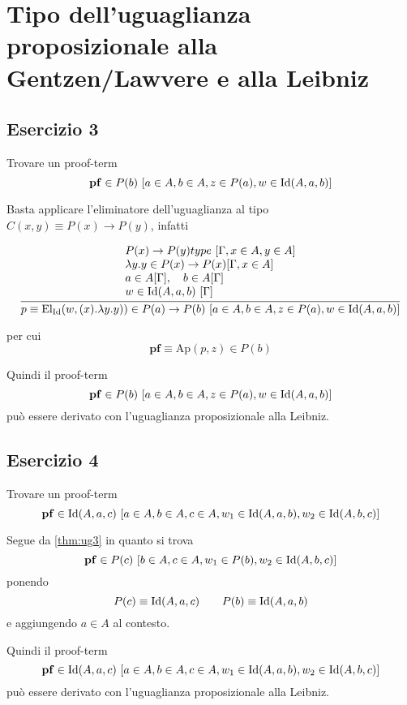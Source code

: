 \newpage
\section{Tipo dell'uguaglianza proposizionale alla Gentzen/Lawvere e alla Leibniz}
\subsection{Esercizio 3}
\begin{thm}\label{thm:ug3} Trovare un proof-term
	\[ \mathbf{pf}\in P(b)\ [a\in A, b\in A, z\in P(a), w\in \mathrm{Id}(A, a, b)]\]
\end{thm}
\proof
Basta applicare l'eliminatore dell'uguaglianza al tipo $C(x,y) \equiv P(x)\to P(y)$, infatti
\begin{scriptsize}
	\[ \infer{p \equiv \mathrm{El}_{\mathrm{Id}}(w, (x).\lambda y. y)) \in P(a)\to P(b)\ [a \in A, b\in A, z\in P(a), w\in \Id{A}{a}{b}]}{\begin{array}{l}P(x)\to P(y) type\ [\Gamma, x \in A, y \in A] \\ \lambda y. y \in P(x) \to P(x)  [\Gamma, x \in A] \\
		a \in A [\Gamma], \quad b \in A [\Gamma] \\
		w \in \Id{A}{a}{b}\ [\Gamma] \end{array}} \]
\end{scriptsize}
per cui 
\[ \mathbf{pf} \equiv \mathrm{Ap}(p, z) \in P(b) \]
\endproof

Quindi il proof-term \[ \mathbf{pf}\in P(b)\ [a\in A, b\in A, z\in P(a), w\in \mathrm{Id}(A, a, b)]\] può essere derivato con l'uguaglianza proposizionale alla Leibniz.

\subsection{Esercizio 4}
\begin{thm}
	Trovare un proof-term
	\[ \mathbf{pf} \in \mathrm{Id}(A, a, c)\ [a\in A, b\in A, c\in A, w_1 \in \mathrm{Id}(A, a, b), w_2 \in \mathrm{Id}(A, b, c) ] \]
\end{thm}

\proof
Segue da \ref{thm:ug3} in quanto si trova
\[ \mathbf{pf} \in P(c)\ [b\in A, c \in A, w_1 \in P(b), w_2 \in \mathrm{Id}(A, b, c)] \]
ponendo
\[ P(c) \equiv \mathrm{Id}(A, a, c) \qquad P(b) \equiv \mathrm{Id}(A, a, b) \]
e aggiungendo $a\in A$ al contesto.
\endproof

Quindi il proof-term \[ \mathbf{pf} \in \mathrm{Id}(A, a, c)\ [a\in A, b\in A, c\in A, w_1 \in \mathrm{Id}(A, a, b), w_2 \in \mathrm{Id}(A, b, c) ] \] può essere derivato con l'uguaglianza proposizionale alla Leibniz.

